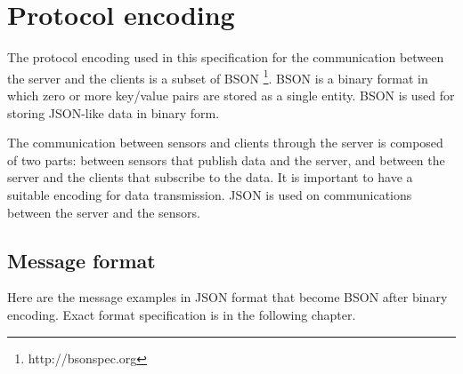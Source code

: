 \chapter{Protocol encoding}
The protocol encoding used in this specification for the communication between the server and
the clients is a subset of BSON \footnote{http://bsonspec.org}. BSON is a binary
format in which zero or more key/value pairs are stored as a single entity. BSON
is used for storing JSON-like data in binary form.


The communication between sensors and clients through the server 
is composed of two parts: between sensors that publish data and the server, and
between the server and the clients that subscribe to the data. It is important
to have a suitable encoding for data transmission. JSON is used on communications
between the server and the sensors.  



  



  
   

\section{Message format}
Here are the message examples in JSON format that become BSON after binary
encoding. Exact format specification is in the following chapter.

